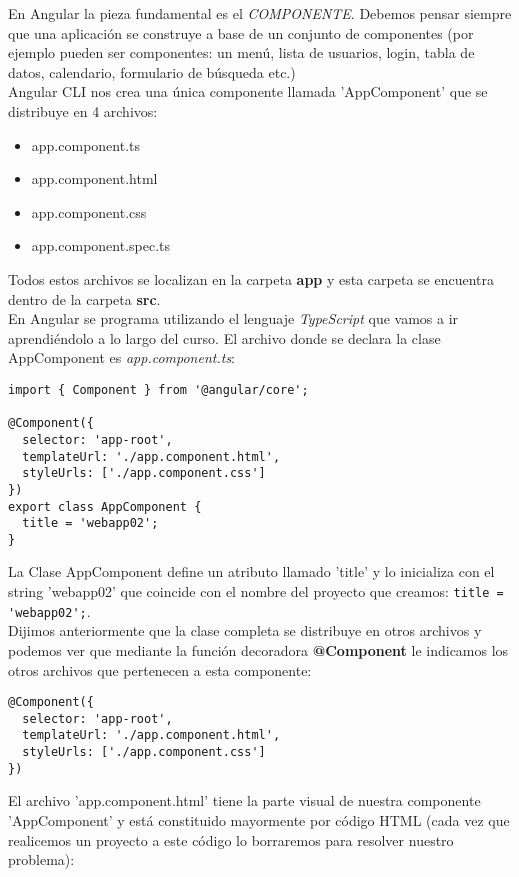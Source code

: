 \documentclass[12pt]{book} %
\begin{document}
En Angular la pieza fundamental es el \emph{COMPONENTE}. Debemos pensar siempre que una aplicación se construye a base de un conjunto de componentes (por ejemplo pueden ser componentes: un menú, lista de usuarios, login, tabla de datos, calendario, formulario de búsqueda etc.)\\

Angular CLI nos crea una única componente llamada 'AppComponent' que se distribuye en 4 archivos:
\begin{itemize}
\item app.component.ts
\item app.component.html
\item app.component.css
\item app.component.spec.ts
\end{itemize}
Todos estos archivos se localizan en la carpeta \textbf{app} y esta carpeta se encuentra dentro de la carpeta \textbf{src}.\\

En Angular se programa utilizando el lenguaje \emph{TypeScript} que vamos a ir aprendiéndolo a lo largo del curso. El archivo donde se declara la clase AppComponent es \emph{app.component.ts}:

\begin{verbatim}
import { Component } from '@angular/core';

@Component({
  selector: 'app-root',
  templateUrl: './app.component.html',
  styleUrls: ['./app.component.css']
})
export class AppComponent {
  title = 'webapp02';
}
\end{verbatim}

La Clase AppComponent define un atributo llamado 'title' y lo inicializa con el string 'webapp02' que coincide con el nombre del proyecto que creamos: \verb_title = 'webapp02';_.\\

Dijimos anteriormente que la clase completa se distribuye en otros archivos y podemos ver que mediante la función decoradora \textbf{@Component} le indicamos los otros archivos que pertenecen a esta componente:

\begin{verbatim}
@Component({
  selector: 'app-root',
  templateUrl: './app.component.html',
  styleUrls: ['./app.component.css']
})
\end{verbatim}

El archivo 'app.component.html' tiene la parte visual de nuestra componente 'AppComponent' y está constituido mayormente por código HTML (cada vez que realicemos un proyecto a este código lo borraremos para resolver nuestro problema):
\end{document}
